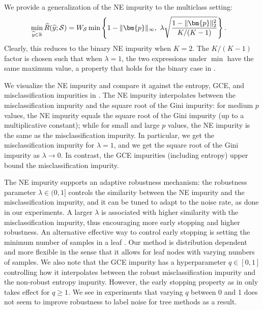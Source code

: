 \documentclass[letterpaper]{article} %
\newcommand{\R}{{\mathbb{R}}}
\newcommand{\bp}{{\bm{p}}}
\newcommand{\cS}{{\cal{S}}}
\newcommand{\WS}{{W_{\cal{S}}}}
\begin{document}
We provide a generalization of the NE impurity to the multiclass setting:
\begin{align*}
	\underset{\widehat{y}\in\R}{\min}\, \widehat{R}(\widehat{y};\cS) 
	&= \WS \min\left\{
		1-\|\bp\|_\infty,\ 
		\lambda
		\sqrt{\frac{1-\|\bp\|_2^2}{K/(K-1)}}
		\right\}.
\end{align*}
Clearly, this reduces to the binary NE impurity when $K = 2$.
The $K/(K-1)$ factor is chosen such that when 
$\lambda 
= 1$, 
the
two expressions under $\min$ have the same maximum value,
a property that
holds for the binary case in .

We visualize the NE impurity and compare it against the 
entropy, 
GCE, %
and 
misclassification 
impurities in .
The NE impurity interpolates between the misclassification impurity and the
square root of the Gini impurity:
for medium $p$ values, the NE impurity equals the square root of the Gini impurity
(up to a multiplicative constant); while for small and large $p$ values, the NE
impurity is the same as the misclassification impurity.
In particular, we get the misclassification impurity for $\lambda=1$, and we get
the square root of the Gini impurity as $\lambda \to 0$.
In contrast, the GCE impurities (including entropy) upper bound the
misclassification impurity.

The NE impurity supports an adaptive robustness mechanism:
the robustness parameter $\lambda \in (0, 1]$ controls the similarity between
the NE impurity and the misclassification impurity, and it can be tuned to adapt
to the noise rate, as done in our experiments.
A larger $\lambda$ is associated with higher similarity with the
misclassification impurity, thus encouraging more early stopping and higher
robustness.
An alternative effective way to control early stopping is setting the minimum
number of samples in a leaf \cite{ghosh2017robustness}.
Our method is distribution dependent and more flexible in the sense that it
allows for leaf nodes with varying numbers of samples. 
We also note that the GCE impurity \cite{zhang2018generalized} has a
hyperparameter $q\in[0,1]$ controlling how it interpolates between the robust
misclassification impurity and the non-robust entropy impurity. 
However, the early stopping property as in  only takes
effect for $q \geq 1$.
We see in experiments that varying $q$ between 0 and 1 does not seem to improve
robustness to label noise for tree methods as a result. 
\end{document}
